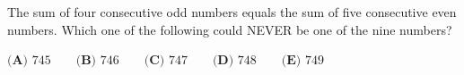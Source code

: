 The sum of four consecutive odd numbers equals the sum of five consecutive even numbers. Which one of the following could NEVER be one of the nine numbers?

$\textbf{(A) }745\qquad\textbf{(B) }746\qquad\textbf{(C) }747\qquad\textbf{(D) }748\qquad\textbf{(E) }749$
